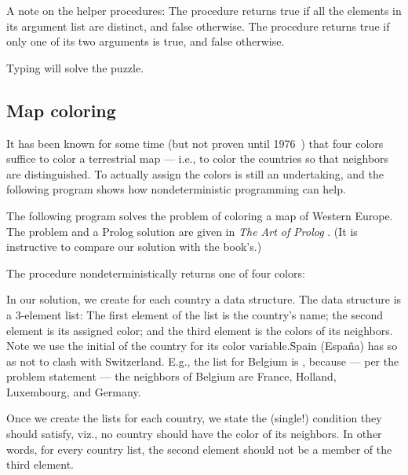 \n A note on the helper procedures: The procedure
 returns true if all the elements in its
argument list are distinct, and false otherwise.  The
procedure  returns true if only one of its two
arguments is true, and false otherwise.

Typing  will solve the puzzle.

\subsection{Map coloring}

It has been known for some time (but not proven until
1976~\cite{4cp}) that four colors suffice to
color a terrestrial map — i.e., to color the countries
so that neighbors are distinguished.  To actually
assign the colors is still an undertaking, and the
following program shows how nondeterministic
programming can help.

The following program solves the problem of coloring a
map of Western Europe.  The problem and a Prolog
solution are given in {\em The Art of
Prolog} \cite{aop}.  (It is instructive to compare
our solution with the book’s.)

%

The procedure  nondeterministically
returns one of four colors:


\n In our solution, we create for each country a data
structure.  The data structure is a 3-element list: The
first element of the list is the country’s name; the
second element is its assigned color; and the third
element is the colors of its neighbors.  Note we use
the initial of the country for its color
variable.\f{Spain (Espa\~na) has  so as not to
clash with Switzerland.}  E.g., the list for Belgium is
, because — per
the problem statement — the neighbors of Belgium are
France, Holland, Luxembourg, and Germany.

Once we create the lists for each country, we state the
(single!) condition they should satisfy, viz., no
country should have the color of its neighbors.  In
other words, for every country list, the second element
should not be a member of the third element.

